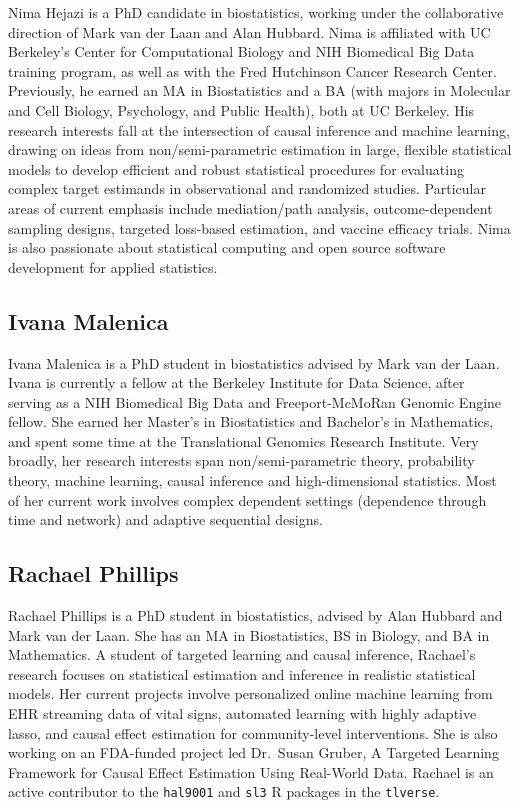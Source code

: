 \documentclass[12pt, krantz2,]{krantz}
\newcommand{\passthrough}[1]{#1}
\theoremstyle{definition}
\theoremstyle{definition}
\theoremstyle{definition}
\newcommand{\1}{\mathbbm{1}}
\begin{document}
Nima Hejazi is a PhD candidate in biostatistics, working under the collaborative
direction of Mark van der Laan and Alan Hubbard. Nima is affiliated with UC
Berkeley's Center for Computational Biology and NIH Biomedical Big Data training
program, as well as with the Fred Hutchinson Cancer Research Center. Previously,
he earned an MA in Biostatistics and a BA (with majors in Molecular and Cell
Biology, Psychology, and Public Health), both at UC Berkeley. His research
interests fall at the intersection of causal inference and machine learning,
drawing on ideas from non/semi-parametric estimation in large, flexible
statistical models to develop efficient and robust statistical procedures for
evaluating complex target estimands in observational and randomized studies.
Particular areas of current emphasis include mediation/path analysis,
outcome-dependent sampling designs, targeted loss-based estimation, and vaccine
efficacy trials. Nima is also passionate about statistical computing and open
source software development for applied statistics.

\hypertarget{ivana-malenica}{%
\subsection*{Ivana Malenica}\label{ivana-malenica}}


Ivana Malenica is a PhD student in biostatistics advised by Mark van der Laan.
Ivana is currently a fellow at the Berkeley Institute for Data Science, after
serving as a NIH Biomedical Big Data and Freeport-McMoRan Genomic Engine fellow.
She earned her Master's in Biostatistics and Bachelor's in Mathematics, and
spent some time at the Translational Genomics Research Institute. Very broadly,
her research interests span non/semi-parametric theory, probability theory,
machine learning, causal inference and high-dimensional statistics. Most of her
current work involves complex dependent settings (dependence through time and
network) and adaptive sequential designs.

\hypertarget{rachael-phillips}{%
\subsection*{Rachael Phillips}\label{rachael-phillips}}


Rachael Phillips is a PhD student in biostatistics, advised by Alan Hubbard and
Mark van der Laan. She has an MA in Biostatistics, BS in Biology, and BA in
Mathematics. A student of targeted learning and causal inference, Rachael's
research focuses on statistical estimation and inference in realistic
statistical models. Her current projects involve personalized online machine
learning from EHR streaming data of vital signs, automated learning with
highly adaptive lasso, and causal effect estimation for community-level
interventions. She is also working on an FDA-funded project led Dr.~Susan
Gruber, A Targeted Learning Framework for Causal Effect Estimation Using
Real-World Data. Rachael is an active contributor to the \passthrough{\lstinline!hal9001!} and \passthrough{\lstinline!sl3!}
R packages in the \passthrough{\lstinline!tlverse!}.
\end{document}
